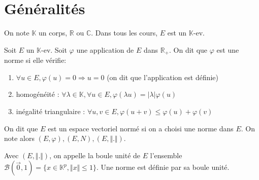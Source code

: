 \documentclass[a4paper,12pt]{book}
\newcommand{\Def}[2]{\begin{tcolorbox}[sharp corners, colback=white,colframe=blue!90!black!75, title=Définition : #1]#2\end{tcolorbox}}
\def\R{\mathbb{R}}
\def\C{\mathbb{C}}
\def\K{\mathbb{K}}
\begin{document}
\section{Généralités}
On note $\K$ un corps, $\R$ ou $\C$. Dans tous les cours, $E$ est un $\K$-ev.
\Def{Norme}{Soit $E$ un $\K$-ev. Soit $\varphi$ une application de $E$ dans $\R_+$. On dit que $\varphi$ est une norme si elle vérifie:\begin{enumerate}
\item $\forall u\in E, \varphi(u) = 0\Rightarrow u=0$ (on dit que l'application est définie)
\item homogénéité : $\forall\lambda\in\K, \forall u\in E,\varphi(\lambda u) =\vert \lambda\vert \varphi(u)$
\item inégalité triangulaire : $\forall u, v\in E, \varphi(u+v) \leq \varphi(u)+\varphi(v)$
\end{enumerate}}
\Def{EVN}{On dit que $E$ est un espace vectoriel normé si on a choisi une norme dans $E$. On note alors $(E,\varphi), (E,N), (E,\Vert.\Vert)$.}
\Def{Boule unité}{Avec $(E,\Vert.\Vert)$, on appelle la boule unité de $E$ l'ensemble $\mathcal{B}(\vec{0}, 1) = \{x\in\K^p, \Vert x\Vert\leq 1\}$. Une norme est définie par sa boule unité.}
\end{document}
